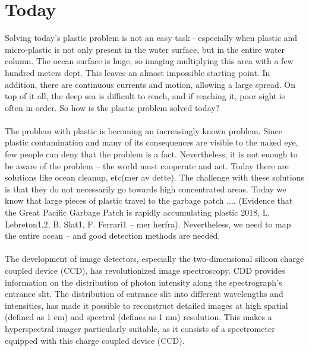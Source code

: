 \section{Today}
Solving today’s plastic problem is not an easy task - especially when plastic and micro-plastic is not only present in the water surface, but in the entire water column. The ocean surface is huge, so imaging multiplying this area with a few hundred meters dept. This leaves an almost impossible starting point. In addition, there are continuous currents and motion, allowing a large spread. On top of it all, the deep sea is difficult to reach, and if reaching it, poor sight is often in order. So how is the plastic problem solved today?
\\\\
The problem with plastic is becoming an increasingly known problem. Since plastic contamination and many of its consequences are visible to the naked eye, few people can deny that the problem is a fact. Nevertheless, it is not enough to be aware of the problem – the world must cooperate and act. Today there are solutions like ocean cleanup, etc(mer av dette). The challenge with these solutions is that they do not necessarily go towards high concentrated areas. Today we know that large pieces of plastic travel to the garbage patch .... (Evidence that the Great Pacific Garbage Patch is rapidly accumulating plastic 2018, L. Lebreton1,2, B. Slat1, F. Ferrari1 – mer herfra). Nevertheless, we need to map the entire ocean – and good detection methods are needed.
\\\\
The development of image detectors, especially the two-dimensional silicon charge coupled device (CCD), has revolutionized image spectroscopy. CDD provides information on the distribution of photon intensity along the spectrograph's entrance slit. The distribution of entrance slit into different wavelengths and intensities, has made it possible to reconstruct detailed images at high spatial (defined as 1 cm) and spectral (defines as 1 nm) resolution. This makes a hyperspectral imager particularly suitable, as it consists of a spectrometer equipped with this charge coupled device (CCD). 

